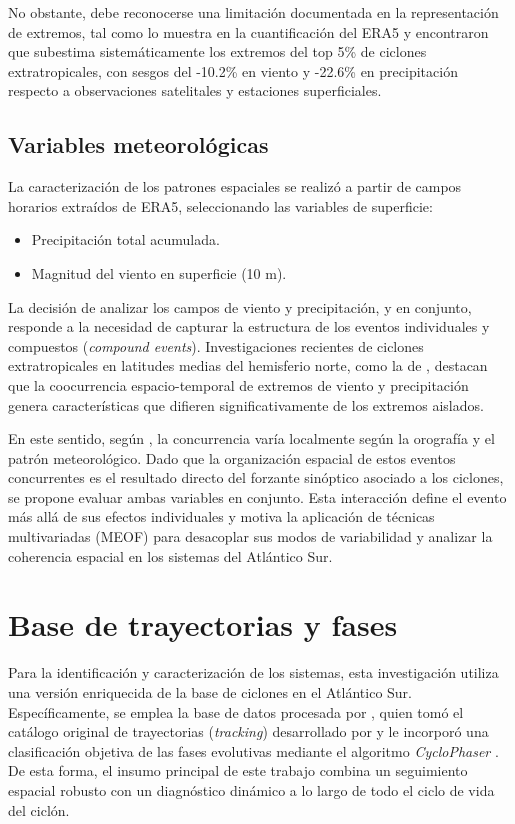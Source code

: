 No obstante, debe reconocerse una limitación documentada en la representación de extremos, tal como lo muestra \citet{chen2024evaluation} en la cuantificación del ERA5 y encontraron que subestima sistemáticamente los extremos del top 5\% de ciclones extratropicales, con sesgos del -10.2\% en viento y -22.6\% en precipitación respecto a observaciones satelitales y estaciones superficiales.

\subsection{Variables meteorológicas}\label{subsec:variables}
La caracterización de los patrones espaciales se realizó a partir de campos horarios extraídos de ERA5, seleccionando las variables de superficie:

\begin{itemize}
    \item Precipitación total acumulada.
    \item Magnitud del viento en superficie (10 m).
\end{itemize}

La decisión de analizar los campos de viento y precipitación, y en conjunto, responde a la necesidad de capturar la estructura de los eventos individuales y compuestos (\textit{compound events}). Investigaciones recientes de ciclones extratropicales en latitudes medias del hemisferio norte, como la de \citet{chen2025characteristics}, destacan que la coocurrencia espacio-temporal de extremos de viento y precipitación genera características que difieren significativamente de los extremos aislados. 

En este sentido, según \citet{zscheischler2018future}, la concurrencia varía localmente según la orografía y el patrón meteorológico. Dado que la organización espacial de estos eventos concurrentes es el resultado directo del forzante sinóptico asociado a los ciclones, se propone evaluar ambas variables en conjunto. Esta interacción define el evento más allá de sus efectos individuales y motiva la aplicación de técnicas multivariadas (MEOF) para desacoplar sus modos de variabilidad y analizar la coherencia espacial en los sistemas del Atlántico Sur.

\section{Base de trayectorias y fases}\label{sec:bd_ciclones}

Para la identificación y caracterización de los sistemas, esta investigación utiliza una versión enriquecida de la base de ciclones en el Atlántico Sur. Específicamente, se emplea la base de datos procesada por \citet{coutodesouza2024new}, quien tomó el catálogo original de trayectorias (\textit{tracking}) desarrollado por \citet{gramcianinov2019properties} y le incorporó una clasificación objetiva de las fases evolutivas mediante el algoritmo \textit{CycloPhaser} \citep{deSouza2025CycloPhaser}. De esta forma, el insumo principal de este trabajo combina un seguimiento espacial robusto con un diagnóstico dinámico a lo largo de todo el ciclo de vida del ciclón.

